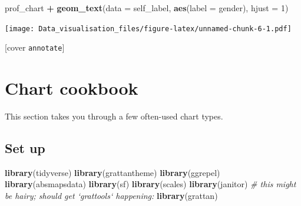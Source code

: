 \documentclass[]{book}
\newenvironment{Shaded}{\begin{snugshade}}{\end{snugshade}}
\newcommand{\CommentTok}[1]{\textcolor[rgb]{0.56,0.35,0.01}{\textit{#1}}}
\newcommand{\DataTypeTok}[1]{\textcolor[rgb]{0.13,0.29,0.53}{#1}}
\newcommand{\DecValTok}[1]{\textcolor[rgb]{0.00,0.00,0.81}{#1}}
\newcommand{\KeywordTok}[1]{\textcolor[rgb]{0.13,0.29,0.53}{\textbf{#1}}}
\newcommand{\NormalTok}[1]{#1}
\newcommand{\OperatorTok}[1]{\textcolor[rgb]{0.81,0.36,0.00}{\textbf{#1}}}
\newcommand{\StringTok}[1]{\textcolor[rgb]{0.31,0.60,0.02}{#1}}
\begin{document}
\begin{Shaded}
\begin{Highlighting}[]
\NormalTok{prof_chart }\OperatorTok{+}
\StringTok{  }\KeywordTok{geom_text}\NormalTok{(}\DataTypeTok{data =}\NormalTok{ self_label,}
            \KeywordTok{aes}\NormalTok{(}\DataTypeTok{label =}\NormalTok{ gender), }
            \DataTypeTok{hjust =} \DecValTok{1}\NormalTok{)}
\end{Highlighting}
\end{Shaded}

\texttt{[image: Data\_visualisation\_files/figure-latex/unnamed-chunk-6-1.pdf]}

{[}cover \texttt{annotate}{]}

\hypertarget{chart-cookbook}{%
\chapter{Chart cookbook}\label{chart-cookbook}}

This section takes you through a few often-used chart types.

\hypertarget{set-up-1}{%
\section{Set up}\label{set-up-1}}

\begin{Shaded}
\begin{Highlighting}[]
\KeywordTok{library}\NormalTok{(tidyverse)}
\KeywordTok{library}\NormalTok{(grattantheme)}
\KeywordTok{library}\NormalTok{(ggrepel)}
\KeywordTok{library}\NormalTok{(absmapsdata)}
\KeywordTok{library}\NormalTok{(sf)}
\KeywordTok{library}\NormalTok{(scales)}
\KeywordTok{library}\NormalTok{(janitor)}
\CommentTok{# this might be hairy; should get `grattools` happening:}
\KeywordTok{library}\NormalTok{(grattan)}
\end{Highlighting}
\end{Shaded}
\end{document}
